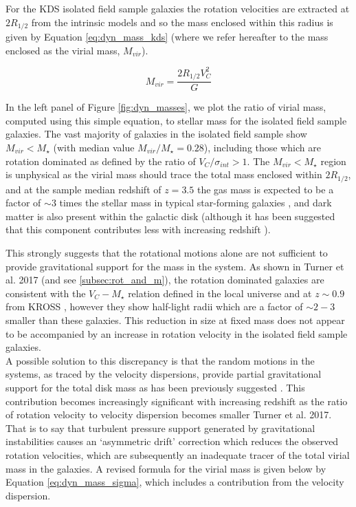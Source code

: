 \documentclass[a4paper,fleqn,usenatbib]{mn2e}
\begin{document}
For the KDS isolated field sample galaxies the rotation velocities are extracted at $2R_{1/2}$ from the intrinsic models and so the mass enclosed within this radius is given by Equation \ref{eq:dyn_mass_kds} (where we refer hereafter to the mass enclosed as the virial mass, $M_{vir}$). 

\begin{equation}\label{eq:dyn_mass_kds}
   M_{vir} = \frac{2R_{1/2}V_{C}^{2}}{G}
\end{equation}

In the left panel of Figure \ref{fig:dyn_masses}, we plot the ratio of virial mass, computed using this simple equation, to stellar mass for the isolated field sample galaxies.
The vast majority of galaxies in the isolated field sample show $M_{vir} < M_{\star}$ (with median value $M_{vir}/M_{\star}=0.28$), including those which are rotation dominated as defined by the ratio of $V_{C}/\sigma_{int} > 1$.
The $M_{vir} < M_{\star}$ region is unphysical as the virial mass should trace the total mass enclosed within $2R_{1/2}$, and at the sample median redshift of $z=3.5$ the gas mass is expected to be a factor of $\sim3$ times the stellar mass in typical star-forming galaxies \citep{Tacconi2013,Tacconi2017}, and dark matter is also present within the galactic disk (although it has been suggested that this component contributes less with increasing redshift \citealt{Ubler2017,Genzel2017,Lang2017}).

This strongly suggests that the rotational motions alone are not sufficient to provide gravitational support for the mass in the system.
As shown in Turner et al. 2017 (and see \cref{subsec:rot_and_m}), the rotation dominated galaxies are consistent with the $V_{C}-M_{\star}$ relation defined in the local universe and at $z\sim0.9$ from KROSS \citep{Harrison2017}, however they show half-light radii which are a factor of $\sim2-3$ smaller than these galaxies.
This reduction in size at fixed mass does not appear to be accompanied by an increase in rotation velocity in the isolated field sample galaxies. \\

A possible solution to this discrepancy is that the random motions in the systems, as traced by the velocity dispersions, provide partial gravitational support for the total disk mass as has been previously suggested \citep[e.g.][]{Burkert2010,Newman2013,Ubler2017}.
This contribution becomes increasingly significant with increasing redshift as the ratio of rotation velocity to velocity dispersion becomes smaller \citep[e.g.][]{ForsterSchreiber2009,Law2009,Epinat2012,Stott2016} Turner et al. 2017.
That is to say that turbulent pressure support generated by gravitational instabilities causes an `asymmetric drift' correction \citep[e.g.][]{Burkert2010} which reduces the observed rotation velocities, which are subsequently an inadequate tracer of the total virial mass in the galaxies.
A revised formula for the virial mass is given below by Equation \ref{eq:dyn_mass_sigma}, which includes a contribution from the velocity dispersion.
\end{document}
